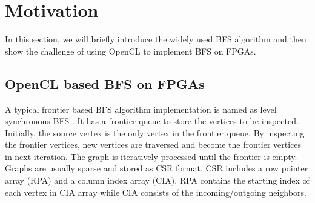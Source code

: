 \section{Motivation} \label{sec:motivation}
In this section, we will briefly introduce the widely used 
BFS algorithm and then show the challenge of 
using OpenCL to implement BFS on FPGAs. 

\subsection{OpenCL based BFS on FPGAs}
A typical frontier based BFS algorithm implementation is named as 
level synchronous BFS \cite{attia2014cygraph, betkaoui2012reconfigurable, 
zhang2017boosting}. It has a frontier queue to store the vertices to 
be inspected. Initially, the source vertex is the only vertex in the frontier queue.
By inspecting the frontier vertices, new vertices are traversed and become 
the frontier vertices in next iteration. The graph is iteratively 
processed until the frontier is empty.
Graphs are usually sparse and stored as CSR format. 
CSR includes a row pointer array (RPA) and a column index array (CIA).
RPA contains the starting index of each vertex in CIA array
while CIA consists of the incoming/outgoing neighbors.


